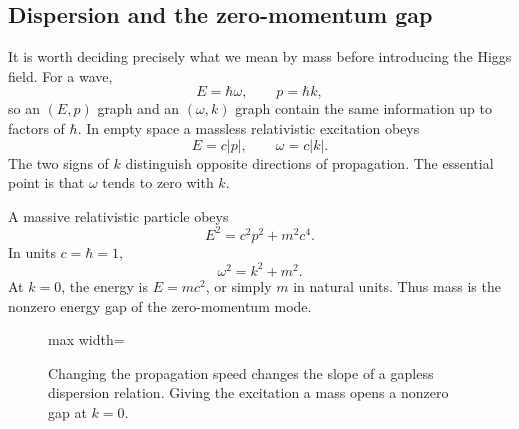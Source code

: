 \subsection{Dispersion and the zero-momentum gap}

It is worth deciding precisely what we mean by mass before introducing the
Higgs field. For a wave,
\begin{equation}
  E=\hbar\omega,
  \qquad
  p=\hbar k,
  \label{eq:l08-quantum-wave}
\end{equation}
so an \((E,p)\) graph and an \((\omega,k)\) graph contain the same
information up to factors of \(\hbar\). In empty space a massless
relativistic excitation obeys
\begin{equation}
  E=c|p|,
  \qquad
  \omega=c|k|.
  \label{eq:l08-massless-dispersion}
\end{equation}
The two signs of \(k\) distinguish opposite directions of propagation. The
essential point is that \(\omega\) tends to zero with \(k\).

A massive relativistic particle obeys
\begin{equation}
  E^2=c^2p^2+m^2c^4.
  \label{eq:l08-massive-dispersion}
\end{equation}
In units \(c=\hbar=1\),
\begin{equation}
  \omega^2=k^2+m^2.
\end{equation}
At \(k=0\), the energy is \(E=mc^2\), or simply \(m\) in natural units.
Thus mass is the nonzero energy gap of the zero-momentum mode.

\begin{figure}[htbp]
\centering
\begin{adjustbox}{max width=\linewidth}
\end{adjustbox}
\caption{Changing the propagation speed changes the slope of a gapless
dispersion relation. Giving the excitation a mass opens a nonzero gap at
\(k=0\).}
\label{fig:l08-dispersion}
\end{figure}


